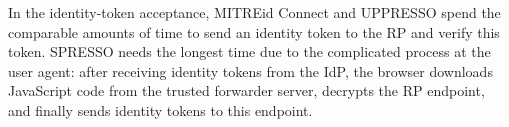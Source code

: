 In the identity-token acceptance,
 MITREid Connect and UPPRESSO spend the comparable amounts of time to send an identity token to the RP and verify this token.
SPRESSO needs the longest time due to the complicated process at the user agent:
        after receiving identity tokens from the IdP,
        the browser downloads JavaScript code from the trusted forwarder server,
            decrypts the RP endpoint, and finally sends identity tokens to this endpoint.

